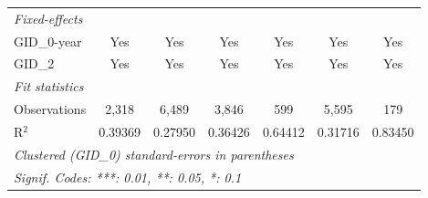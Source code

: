 \begin{table}[H]
\begin{tabular}{lcccccc}
      \midrule
      \emph{Fixed-effects}\\
      GID\_0-year                                          & Yes      & Yes           & Yes           & Yes          & Yes      & Yes\\  
      GID\_2                                               & Yes      & Yes           & Yes           & Yes          & Yes      & Yes\\  
      \midrule
      \emph{Fit statistics}\\
      Observations                                         & 2,318    & 6,489         & 3,846         & 599          & 5,595    & 179\\  
      R$^2$                                                & 0.39369  & 0.27950       & 0.36426       & 0.64412      & 0.31716  & 0.83450\\  
      \midrule \midrule
      \multicolumn{7}{l}{\emph{Clustered (GID\_0) standard-errors in parentheses}}\\
      \multicolumn{7}{l}{\emph{Signif. Codes: ***: 0.01, **: 0.05, *: 0.1}}\\
   \end{tabular}
\end{table}


